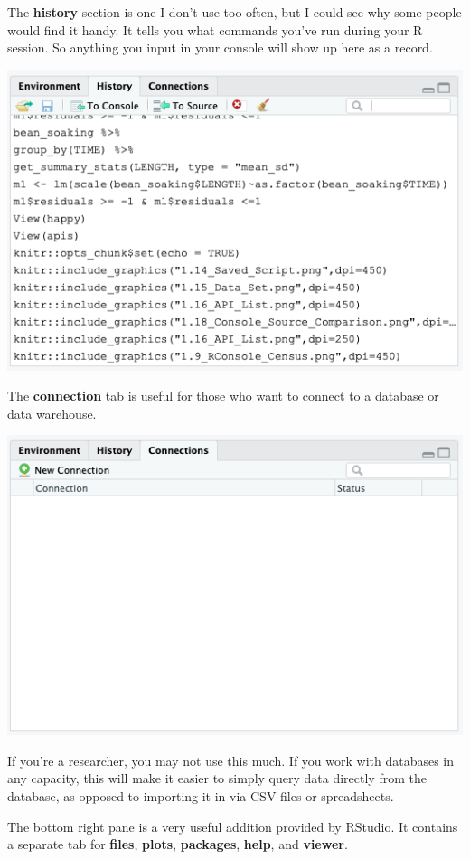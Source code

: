 \documentclass[
]{book}
\begin{document}
The \textbf{history} section is one I don't use too often, but I could see why some people would find it handy. It tells you what commands you've run during your R session. So anything you input in your console will show up here as a record.

\begin{center}\includegraphics[width=0.75\linewidth]{1.21_History_Tab} \end{center}

The \textbf{connection} tab is useful for those who want to connect to a database or data warehouse.

\begin{center}\includegraphics[width=0.75\linewidth]{1.22_Connections_Tab} \end{center}

If you're a researcher, you may not use this much. If you work with databases in any capacity, this will make it easier to simply query data directly from the database, as opposed to importing it in via CSV files or spreadsheets.

The bottom right pane is a very useful addition provided by RStudio. It contains a separate tab for \textbf{files}, \textbf{plots}, \textbf{packages}, \textbf{help}, and \textbf{viewer}.
\end{document}
